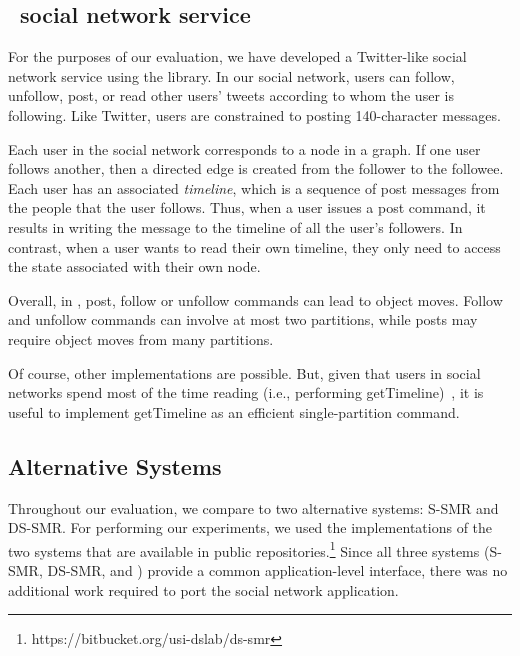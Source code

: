 \subsection{\appname\ social network service}
\label{sec:imp:\appname}

For the purposes of our evaluation, we have developed a Twitter-like
social network service using the \dynastar{} library.  In our social
network, users can follow, unfollow, post, or read other users' tweets
according to whom the user is following. Like Twitter, users are
constrained to posting 140-character messages.

Each user in the social network corresponds to a node in a graph. If
one user follows another, then a directed edge is created from the
follower to the followee. Each user has an associated \emph{timeline},
which is a sequence of post messages from the people that the user
follows. Thus, when a user issues a post command, it results in
writing the message to the timeline of all the user's followers.  In
contrast, when a user wants to read their own timeline, they only need
to access the state associated with their own node.

Overall, in \appname, post, follow or unfollow commands can lead to
object moves.  Follow and unfollow commands can involve at most two
partitions, while posts may require object moves from many partitions.

Of course, other implementations are possible. But, given that users
in social networks spend most of the time reading (i.e., performing
getTimeline)~\cite{facebookTAO}, it is useful to implement getTimeline
as an efficient single-partition command.


\subsection{Alternative Systems}

Throughout our evaluation, we compare \dynastar{} to two alternative
systems: S-SMR and DS-SMR. For performing our experiments, we used the
implementations of the two systems that are available in public
repositories.\footnote{https://bitbucket.org/usi-dslab/ds-smr} Since
all three systems (S-SMR, DS-SMR, and \dynastar) provide a common
application-level interface, there was no additional work required to
port the social network application.

